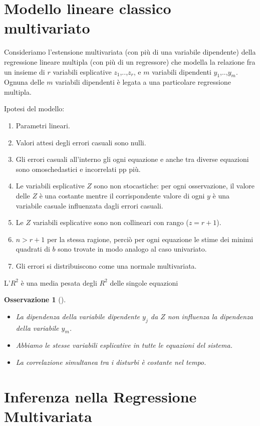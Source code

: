 \documentclass[a4page, 11pt]{article} %
\newtheorem*{remark}{Osservazione}
\begin{document}
\section{Modello lineare classico multivariato}

Consideriamo l’estensione multivariata (con più di una variabile dipendente) della regressione lineare multipla (con più di un regressore) che modella la relazione fra un insieme di $r$ variabili esplicative $z_1$,..,$z_r$, e $m$ variabili dipendenti $y_1$,..,$y_m$. Ognuna delle $m$ variabili dipendenti è legata a una particolare regressione multipla. 

Ipotesi del modello:
\begin{enumerate}[noitemsep]
\item Parametri lineari.
\item Valori attesi degli errori casuali sono nulli.
\item Gli errori casuali all’interno gli ogni equazione e anche tra diverse equazioni sono omoschedastici e incorrelati pp più.
\item Le  variabili esplicative $Z$ sono non stocastiche: per ogni osservazione, il valore delle $Z$ è una costante mentre il corrispondente valore di ogni $y$ è una variabile casuale influenzata dagli errori casuali.
\item Le $Z$ variabili esplicative sono non collineari con rango ($z=r+1$).
\item $n > r+1$ per la stessa ragione, perciò per ogni equazione le stime dei minimi quadrati di $b$ sono trovate in modo analogo al caso univariato. %
\item Gli errori si distribuiscono come una normale multivariata.
\end{enumerate}
L’$R^{2}$ è una media pesata degli $R^{2}$ delle singole equazioni

\begin{remark}[] \ \\
\begin{itemize}
\item La dipendenza della variabile dipendente $y_j$ da $Z$ non influenza la dipendenza della variabile $y_m$.
\item Abbiamo le stesse variabili esplicative in tutte le equazioni del sistema.
\item La correlazione simultanea tra i disturbi è costante nel tempo.
\end{itemize}
\end{remark}
\section{Inferenza nella Regressione Multivariata}
\end{document}
